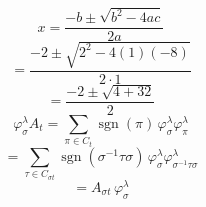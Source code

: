 \documentclass{article}
\begin{document}
\[x = \frac{-b \pm \sqrt{b^2 - 4ac}}{2a}\]
\[= \frac{-2 \pm \sqrt{2^2 - 4(1)(-8)}}{2 \cdot 1}\]
\[= \frac{-2 \pm \sqrt{4 + 32}}{2}\]
\[\varphi^\lambda_{\sigma} A_t
= \sum_{\pi \in C_t} \operatorname{sgn}(\pi)\,
\varphi^\lambda_{\sigma}\varphi^\lambda_{\pi}\]
\[= \sum_{\tau \in C_{\sigma t}} \operatorname{sgn}(\sigma^{-1}\tau\sigma)\,
\varphi^\lambda_{\sigma}\varphi^\lambda_{\sigma^{-1}\tau\sigma}\]
\[= A_{\sigma t}\, \varphi^\lambda_{\sigma}\]
\end{document}
